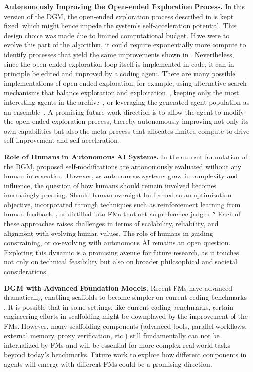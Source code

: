 \documentclass{article} %
\begin{document}
\textbf{Autonomously Improving the Open-ended Exploration Process.}
In this version of the DGM, the open-ended exploration process described in  is kept fixed, which might hence impede the system's self-acceleration potential. This design choice was made due to limited computational budget. If we were to evolve this part of the algorithm, it could require exponentially more compute to identify processes that yield the same improvements shown in . Nevertheless, since the open-ended exploration loop itself is implemented in code, it can in principle be edited and improved by a coding agent. There are many possible implementations of open-ended exploration, for example, using alternative search mechanisms that balance exploration and exploitation~\citep{herr2025llm}, keeping only the most interesting agents in the archive~\citep{faldor2025omni}, or leveraging the generated agent population as an ensemble~\citep{samvelyan2024rainbow}. A promising future work direction is to allow the agent to modify the open-ended exploration process, thereby autonomously improving not only its own capabilities but also the meta-process that allocates limited compute to drive self-improvement and self-acceleration.

\textbf{Role of Humans in Autonomous AI Systems.}
In the current formulation of the DGM, proposed self-modifications are autonomously evaluated without any human intervention. However, as autonomous systems grow in complexity and influence, the question of how humans should remain involved becomes increasingly pressing. Should human oversight be framed as an optimization objective, incorporated through techniques such as reinforcement learning from human feedback~\citep{ouyang2022training}, or distilled into FMs that act as preference judges~\citep{bai2022constitutional}? Each of these approaches raises challenges in terms of scalability, reliability, and alignment with evolving human values. The role of humans in guiding, constraining, or co-evolving with autonomous AI remains an open question. Exploring this dynamic is a promising avenue for future research, as it touches not only on technical feasibility but also on broader philosophical and societal considerations.

\textbf{DGM with Advanced Foundation Models.}
Recent FMs have advanced dramatically, enabling scaffolds to become simpler on current coding benchmarks \citep{yang2024sweagent}. It is possible that in some settings, like current coding benchmarks, certain engineering efforts in scaffolding might be downplayed by the improvement of the FMs. However, many scaffolding components (advanced tools, parallel workflows, external memory, proxy verification, etc.) still fundamentally can not be internalized by FMs and will be essential for more complex real-world tasks beyond today’s benchmarks. Future work to explore how different components in agents will emerge with different FMs could be a promising direction. 
\end{document}
